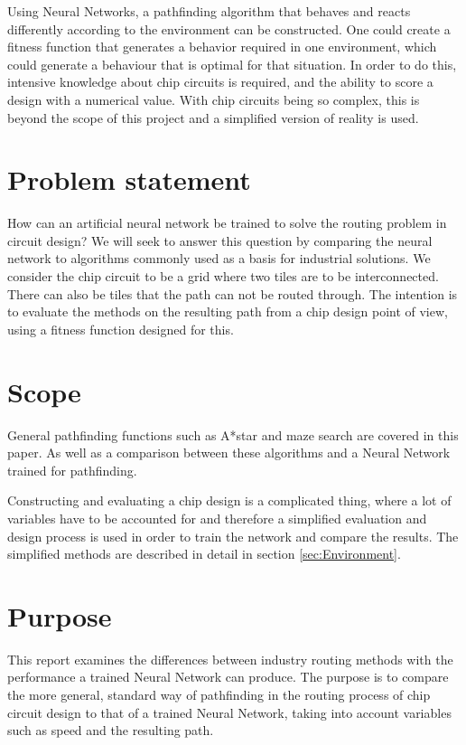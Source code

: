 \documentclass{kththesis}
\begin{document}
Using Neural Networks, a pathfinding algorithm that behaves and reacts differently according to the environment can be constructed. One could create a fitness function that generates a behavior required in one environment, which could generate a behaviour that is optimal for that situation. In order to do this, intensive knowledge about chip circuits is required, and the ability to score a design with a numerical value. With chip circuits being so complex, this is beyond the scope of this project and a simplified version of reality is used.





\section{Problem statement}
How can an artificial neural network be trained to solve the routing problem in circuit design? We will seek to answer this question by comparing the neural network to algorithms commonly used as a basis for industrial solutions.
 We consider the chip circuit to be a grid where two tiles are to be interconnected. There can also be tiles that the path can not be routed through.
The intention is to evaluate the methods on the resulting path from a chip design point of view, using a fitness function designed for this.

\section{Scope}
General pathfinding functions such as A*star and maze search are covered in this paper. As well as a comparison between these algorithms and a Neural Network trained for pathfinding. 

Constructing and evaluating a chip design is a complicated thing, where a lot of variables have to be accounted for and therefore a simplified evaluation and design process is used in order to train the network and compare the results. The simplified methods are described in detail in section \ref{sec:Environment}.

\section{Purpose}
This report examines the differences between industry routing methods with the performance a trained Neural Network can produce. The purpose is to compare the more general, standard way of pathfinding in the routing process of chip circuit design to that of a trained Neural Network, taking into account variables such as speed and the resulting path. 
\end{document}
